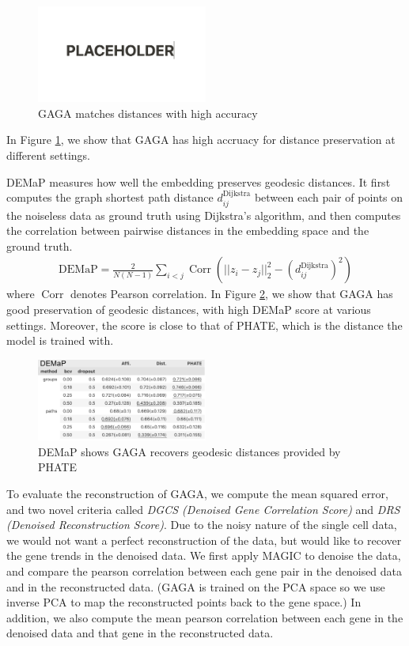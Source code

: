 \documentclass{article}
\theoremstyle{plain}
\theoremstyle{definition}
\theoremstyle{remark}
\newcommand{\methodshort}{GAGA\xspace}
\begin{document}
\begin{figure}[htbp]
    \centering
    \includegraphics[width=0.5\textwidth]{fig/PLACEHOLDER.png}
    \caption{\methodshort matches distances with high accuracy}
    \label{fig:dist_acc}
\end{figure}
\par In Figure \ref{fig:dist_acc}, we show that \methodshort has high accruacy for distance preservation at different settings.
\par DEMaP\cite{moon2019visualizing} measures how well the embedding preserves geodesic distances. It first computes the graph shortest path distance $d_{ij}^{\text{Dijkstra}}$ between each pair of points on the noiseless data as ground truth using Dijkstra's algorithm, and then computes the correlation between pairwise distances in the embedding space and the ground truth.
\begin{align}
    \text{DEMaP}=\frac{2}{N(N-1)}\sum_{i<j}\operatorname{Corr}(||z_i-z_j||^2_2-(d_{ij}^{\text{Dijkstra}})^2)
\end{align}
where $\operatorname{Corr}$ denotes Pearson correlation.
In Figure \ref{fig:demap}, we show that \methodshort has good preservation of geodesic distances, with high DEMaP score at various settings. Moreover, the score is close to that of PHATE, which is the distance the model is trained with.
\begin{figure}[htbp]
    \centering
    \includegraphics[width=0.5\textwidth]{fig/demap.png}
    \caption{DEMaP shows \methodshort recovers geodesic distances provided by PHATE}
    \label{fig:demap}
\end{figure}
\par To evaluate the reconstruction of \methodshort, we compute the mean squared error, and two novel criteria called \textit{DGCS (Denoised Gene Correlation Score)} and \textit{DRS (Denoised Reconstruction Score)}. Due to the noisy nature of the single cell data, we would not want a perfect reconstruction of the data, but would like to recover the gene trends in the denoised data. We first apply MAGIC\cite{van2018recovering} to denoise the data, and compare the pearson correlation between each gene pair in the denoised data and in the reconstructed data. (\methodshort is trained on the PCA space so we use inverse PCA to map the reconstructed points back to the gene space.) In addition, we also compute the mean pearson correlation between each gene in the denoised data and that gene in the reconstructed data.
\end{document}

